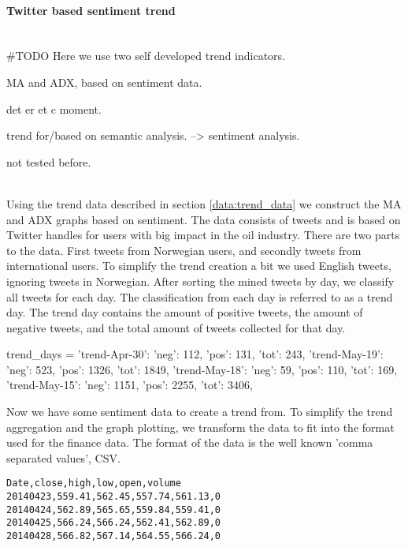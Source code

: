 \paragraph{Twitter based sentiment trend} 
\hspace{0pt}\\
#TODO 
Here we use two self developed trend indicators. 

MA and ADX, based on  sentiment data. 

det er et c moment. 

trend for/based on semantic analysis. --> sentiment analysis. 

not tested before. 

\\

Using the trend data described in section \ref{data:trend_data} we construct
the MA and ADX graphs based on sentiment. The data consists of tweets and is
based on Twitter handles for users with big impact in the oil industry. There
are two parts to the data. First tweets from Norwegian users, and secondly
tweets from international users. To simplify the trend creation a bit we used
English tweets, ignoring tweets in Norwegian. After sorting the mined tweets by
day, we classify all tweets for each day. The classification from each day is
referred to as a trend day. The trend day contains the amount of positive
tweets, the amount of negative tweets, and the total amount of tweets collected
for that day. 

\begin{python}
trend_days = {
	'trend-Apr-30': {'neg': 112, 'pos': 131, 'tot': 243},
    'trend-May-19': {'neg': 523, 'pos': 1326, 'tot': 1849},
    'trend-May-18': {'neg': 59, 'pos': 110, 'tot': 169},
    'trend-May-15': {'neg': 1151, 'pos': 2255, 'tot': 3406},
}
\end{python}  

Now we have some sentiment data to create a trend from. To simplify the trend
aggregation and the graph plotting, we transform the data to fit into the
format used for the finance data. The format of the data is the well known
'comma separated values', CSV.  

\begin{verbatim}
Date,close,high,low,open,volume
20140423,559.41,562.45,557.74,561.13,0
20140424,562.89,565.65,559.84,559.41,0
20140425,566.24,566.24,562.41,562.89,0
20140428,566.82,567.14,564.55,566.24,0
\end{verbatim}

